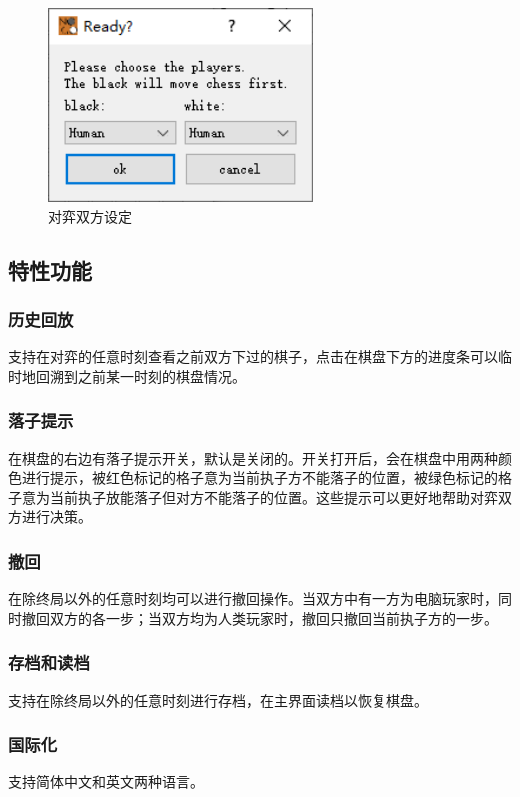 \documentclass[UTF-8]{ctexart}
\begin{document}
			\begin{figure}[H]
				\centering
				\includegraphics[width=7cm]{./file/player.png}
				\caption{对弈双方设定}
			\end{figure}
		\subsection{特性功能}
			\subsubsection{历史回放}
				支持在对弈的任意时刻查看之前双方下过的棋子，点击在棋盘下方的进度条可以临时地回溯到之前某一时刻的棋盘情况。
			\subsubsection{落子提示}
				在棋盘的右边有落子提示开关，默认是关闭的。开关打开后，会在棋盘中用两种颜色进行提示，被红色标记的格子意为当前执子方不能落子的位置，被绿色标记的格子意为当前执子放能落子但对方不能落子的位置。这些提示可以更好地帮助对弈双方进行决策。
			\subsubsection{撤回}
				在除终局以外的任意时刻均可以进行撤回操作。当双方中有一方为电脑玩家时，同时撤回双方的各一步；当双方均为人类玩家时，撤回只撤回当前执子方的一步。
			\subsubsection{存档和读档}
				支持在除终局以外的任意时刻进行存档，在主界面读档以恢复棋盘。
			\subsubsection{国际化}
				支持简体中文和英文两种语言。
\end{document}
